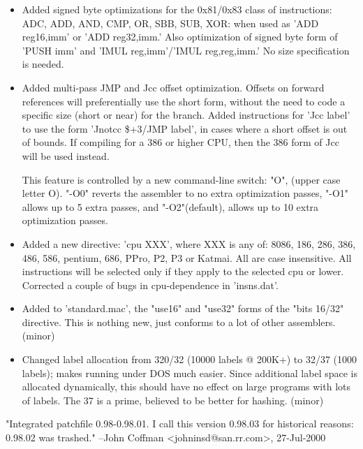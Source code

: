 \begin{itemize}
    \item{Added signed byte optimizations for the 0x81/0x83 class
        of instructions: ADC, ADD, AND, CMP, OR, SBB, SUB, XOR:
        when used as 'ADD reg16,imm' or 'ADD reg32,imm.'  Also
        optimization of signed byte form of 'PUSH imm' and 'IMUL
        reg,imm'/'IMUL reg,reg,imm.'  No size specification is needed.}
    \item{Added multi-pass JMP and Jcc offset optimization. Offsets
        on forward references will preferentially use the short form,
        without the need to code a specific size (short or near) for
        the branch. Added instructions for 'Jcc label' to use the
        form 'Jnotcc \$+3/JMP label', in cases where a short offset
        is out of bounds. If compiling for a 386 or higher CPU, then
        the 386 form of Jcc will be used instead.

        This feature is controlled by a new command-line switch: "O",
        (upper case letter O). "-O0" reverts the assembler to no
        extra optimization passes, "-O1" allows up to 5 extra passes,
        and "-O2"(default), allows up to 10 extra optimization passes.}
    \item{Added a new directive:  'cpu XXX', where XXX is any of:
        8086, 186, 286, 386, 486, 586, pentium, 686, PPro, P2, P3 or
        Katmai. All are case insensitive. All instructions will
        be selected only if they apply to the selected cpu or lower.
        Corrected a couple of bugs in cpu-dependence in 'insns.dat'.}
    \item{Added to 'standard.mac', the "use16" and "use32" forms of
        the "bits 16/32" directive. This is nothing new, just conforms
        to a lot of other assemblers. (minor)}
    \item{Changed label allocation from 320/32 (10000 labels @ 200K+)
        to 32/37 (1000 labels); makes running under DOS much easier.
        Since additional label space is allocated dynamically, this
        should have no effect on large programs with lots of labels.
        The 37 is a prime, believed to be better for hashing. (minor)}
\end{itemize}


"Integrated patchfile 0.98-0.98.01. I call this version 0.98.03 for
historical reasons: 0.98.02 was trashed." --John Coffman
<johninsd@san.rr.com>, 27-Jul-2000

